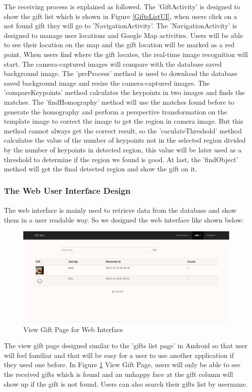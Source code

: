 \par The receiving process is explained as followed. The 'GiftActivity' is designed to show the gift list which is shown in Figure \ref{GiftsListUI}, when users click on a not found gift they will go to 'NavigationActivity'. The 'NavigationActivity' is designed to manage user locations and Google Map activities. Users will be able to see their location on the map and the gift location will be marked as a red point. When users find where the gift locates, the real-time image recognition will start. The camera-captured images will compare with the database saved background image. The 'preProcess' method is used to download the database saved background image and resize the camera-captured images. The 'compareKeypoints' method calculates the keypoints in two images and finds the matches. The 'findHomography' method will use the matches found before to generate the homography and perform a perspective transformation on the template image to correct the image to get the region in camera image. But this method cannot always get the correct result, so the 'caculateThreshold' method calculates the value of the number of keypoints not in the selected region divided by the number of keypoints in detected region, this value will be later used as a threshold to determine if the region we found is good. At last, the 'findObject' method will get the final detected region and show the gift on it.

\subsubsection{The Web User Interface Design}
\paragraph{} The web interface is mainly used to retrieve data from the database and show them in a user readable way. So we designed the web interface like shown below:
\begin{figure}[htb]
\centering
\includegraphics[width=.9\textwidth]{section03/assets/ViewGifts.png}
\caption[View Gift Page for Web Interface]{\label{ViewGift}View Gift Page for Web Interface}
\end{figure}
\par The view gift page designed similar to the 'gifts list page' in Android so that user will feel familiar and that will be easy for a user to use another application if they used one before. In Figure \ref{ViewGift} View Gift Page, users will only be able to see the received gifts which is found and an unhappy face at the gift column will show up if the gift is not found. Users can also search their gifts list by username.

